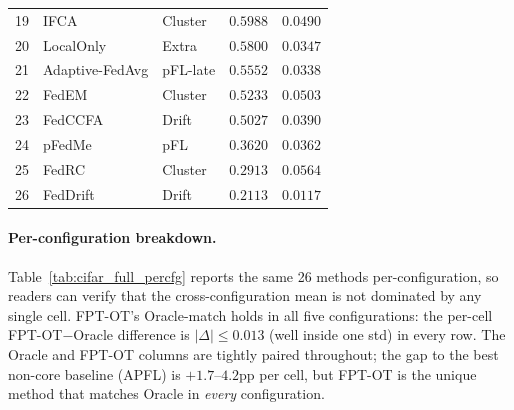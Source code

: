 \begin{table}[h]
\begin{tabular}{lllcc}
19 & IFCA              & Cluster       & $0.5988$  & $0.0490$ \\
20 & LocalOnly         & Extra         & $0.5800$  & $0.0347$ \\
21 & Adaptive-FedAvg   & pFL-late      & $0.5552$  & $0.0338$ \\
22 & FedEM             & Cluster       & $0.5233$  & $0.0503$ \\
23 & FedCCFA           & Drift         & $0.5027$  & $0.0390$ \\
24 & pFedMe            & pFL           & $0.3620$  & $0.0362$ \\
25 & FedRC             & Cluster       & $0.2913$  & $0.0564$ \\
26 & FedDrift          & Drift         & $0.2113$  & $0.0117$ \\
\bottomrule
\end{tabular}
\end{table}

\paragraph{Per-configuration breakdown.}
Table~\ref{tab:cifar_full_percfg} reports the same 26 methods per-configuration, so readers can verify that the cross-configuration mean is not dominated by any single cell. FPT-OT's Oracle-match holds in all five configurations: the per-cell FPT-OT$-$Oracle difference is $|\Delta| \le 0.013$ (well inside one std) in every row. The Oracle and FPT-OT columns are tightly paired throughout; the gap to the best non-core baseline (APFL) is $+1.7$--$4.2$pp per cell, but FPT-OT is the unique method that matches Oracle in \emph{every} configuration.


